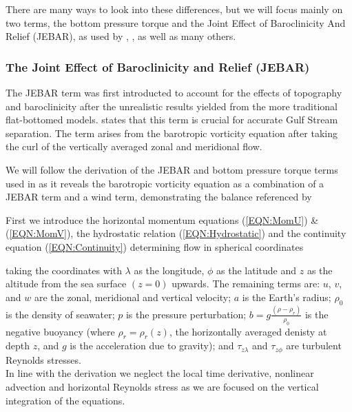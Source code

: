 \documentclass[..\EOYR.tex]{subfiles}
\begin{document}
There are many ways to look into these differences, but we will focus mainly on two terms, the bottom pressure torque and the Joint Effect of Baroclinicity And Relief (JEBAR), as used by \citep{Greatbatch1991}, \citep{Bell1999}, \citep{Gula2014} as well as many others. 


\subsubsection{The Joint Effect of Baroclinicity and Relief (JEBAR)}
\label{SSSEC:JEBAR}

The JEBAR term was first introducted to account for the effects of topography and baroclinicity after the unrealistic results yielded from the more traditional flat-bottomed models. \citep{Meyers1996} states that this term is crucial for accurate Gulf Stream separation.
The term arises from the barotropic vorticity equation after taking the curl of the vertically averaged zonal and meridional flow.
\par
We will follow the derivation of the JEBAR and bottom pressure torque terms used in \citep{Greatbatch1991} as it reveals the barotropic vorticity equation as a combination of a JEBAR term and a wind term, demonstrating the balance referenced by \citep{NaveiraGarabato2013}

First we introduce the horizontal momentum equations (\ref{EQN:MomU}) \& (\ref{EQN:MomV}), the hydrostatic relation (\ref{EQN:Hydrostatic}) and the continuity equation (\ref{EQN:Continuity}) determining flow in spherical coordinates






taking the coordinates with $\lambda$ as the longitude, $\phi$ as the latitude and $z$ as the altitude from the sea surface $\left(z=0\right)$ upwards.
The remaining terms are: $u$, $v$, and $w$ are the zonal, meridional and vertical velocity; $a$ is the Earth's radius; $\rho_0$ is the density of seawater; $p$ is the pressure perturbation; $b=g\frac{\left(\rho-\rho_r\right)}{\rho_0}$ is the negative buoyancy (where $\rho_r=\rho_r(z)$, the horizontally averaged denisty at depth $z$, and $g$ is the acceleration due to gravity); and $\tau_{z\lambda}$ and $\tau_{z\phi}$ are turbulent Reynolds stresses.\\
In line with the \citep{Greatbatch1991} derivation 
we neglect the local time derivative, nonlinear advection and horizontal Reynolds stress as we are focused on the vertical integration of the equations.
\end{document}
